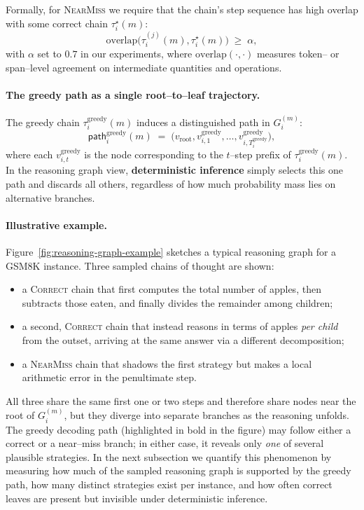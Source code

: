 Formally, for \textsc{NearMiss} we require that the chain's step
sequence has high overlap with some correct chain
$\tau^{\star}_i(m)$:
\[
  \text{overlap}\bigl(\tau_i^{(j)}(m), \tau^{\star}_i(m)\bigr)
  \;\ge\; \alpha,
\]
with $\alpha$ set to $0.7$ in our experiments, where
$\text{overlap}(\cdot,\cdot)$ measures token-- or span--level agreement
on intermediate quantities and operations.

\paragraph{The greedy path as a single root--to--leaf trajectory.}
The greedy chain $\tau_i^{\mathrm{greedy}}(m)$ induces a distinguished
path in $G_i^{(m)}$:
\[
  \mathsf{path}_i^{\mathrm{greedy}}(m)
  \;=\;
  \bigl(
    v_{\mathrm{root}},
    v_{i,1}^{\mathrm{greedy}},
    \dots,
    v_{i,T_i^{\mathrm{greedy}}}^{\mathrm{greedy}}
  \bigr),
\]
where each $v_{i,t}^{\mathrm{greedy}}$ is the node corresponding to the
$t$--step prefix of $\tau_i^{\mathrm{greedy}}(m)$.
In the reasoning graph view, \textbf{deterministic inference} simply
selects this one path and discards all others, regardless of how much
probability mass lies on alternative branches.

\paragraph{Illustrative example.}
Figure~\ref{fig:reasoning-graph-example} sketches a typical reasoning
graph for a GSM8K instance.
Three sampled chains of thought are shown:

\begin{itemize}[leftmargin=1.5em]
  \item a \textsc{Correct} chain that first computes the total number of
  apples, then subtracts those eaten, and finally divides the remainder
  among children;

  \item a second, \textsc{Correct} chain that instead reasons in terms
  of apples \emph{per child} from the outset, arriving at the same
  answer via a different decomposition;

  \item a \textsc{NearMiss} chain that shadows the first strategy but
  makes a local arithmetic error in the penultimate step.
\end{itemize}

All three share the same first one or two steps and therefore share
nodes near the root of $G_i^{(m)}$, but they diverge into separate
branches as the reasoning unfolds.
The greedy decoding path (highlighted in bold in the figure) may follow
either a correct or a near--miss branch; in either case, it reveals only
\emph{one} of several plausible strategies.
In the next subsection we quantify this phenomenon by measuring how much
of the sampled reasoning graph is supported by the greedy path, how many
distinct strategies exist per instance, and how often correct leaves are
present but invisible under deterministic inference.

